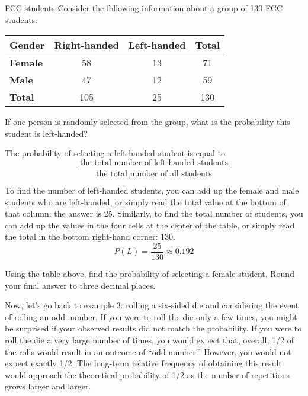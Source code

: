 \begin{example}[https://www.youtube.com/watch?v=1aebOnTckVY&list=PLfmpjsIzhzts14-9s5QixRje97EI2oeMF&index=8]{FCC students}
Consider the following information about a group of 130 FCC students:

\begin{center}
\begin{tabular}{l | c c | c}
\textbf{Gender} & \textbf{Right-handed} & \textbf{Left-handed} & \textbf{Total} \\ \hline 
\textbf{Female} & 58 & 13 & 71\\ 
\textbf{Male} & 47 & 12 & 59  \\ \hline
\textbf{Total} & 105 & 25 & 130 \\  
\end{tabular}
\end{center}

If one person is randomly selected from the group, what is the probability this student is left-handed? 

\sol
The probability of selecting a left-handed student is equal to 
\[\dfrac{\textrm{the total number of left-handed students}}{\textrm{the total number of all students}}\]

To find the number of left-handed students, you can add up the female and male students who are left-handed, or simply read the total value at the bottom of that column: the answer is 25.  Similarly, to find the total number of students, you can add up the values in the four cells at the center of the table, or simply read the total in the bottom right-hand corner: 130.
\[  P(L) = \boxed{\frac{25}{130} \approx 0.192} \]
\end{example}

\begin{try}
Using the table above, find the probability of selecting a female student. Round your final answer to three decimal places.
\end{try}  
\vfill
\pagebreak

Now, let's go back to example 3: rolling a six-sided die and considering the event of rolling an odd number. If you were to roll the die only a few times, you might be
surprised if your observed results did not match the probability. If you were to roll the die a very large number of times, you
would expect that, overall, 1/2 of the rolls would result in an outcome of ``odd number.''  However, you would not expect exactly 1/2.  The long-term relative frequency of obtaining this result would approach the theoretical probability of 1/2 as the number of repetitions grows larger and larger. 

